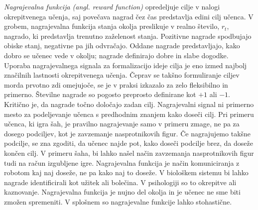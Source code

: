 \documentclass[a4paper, oneside, 12pt]{report}
\begin{document}
{\em Nagrajevalna funkcija (angl. reward function)} opredeljuje cilje v nalogi okrepitvenega učenja, saj povečava nagrad čez čas predstavlja edini cilj učenca. V grobem, nagrajevalna funkcija stanja okolja preslikuje v realno število, $r_t$, nagrado, ki predstavlja trenutno zaželenost stanja. Pozitivne nagrade spodbujajo obiske stanj, negativne pa jih odvračajo. Oddane nagrade predstavljajo, kako dobro se učenec vede v okolju; nagrade definirajo dobre in slabe dogodke. Uporaba nagrajevalnega signala za formalizacijo ideje cilja je eno izmed najbolj značilnih lastnosti okrepitvenega učenja. Čeprav se takšno formuliranje ciljev morda prvotno zdi omejujoče, se je v praksi izkazalo za zelo fleksibilno in primerno. Številne nagrade so pogosto preprosto definirane kot $+1$ ali $-1$. Kritično je, da nagrade točno določajo zadan cilj. Nagrajevalni signal ni primerno mesto za podeljevanje učenca s predhodnim znanjem kako doseči cilj. Pri primeru učenca, ki igra šah, je pravilno nagrajevanje samo v primeru zmage, ne pa za dosego podciljev, kot je zavzemanje nasprotnikovih figur. Če nagrajujemo takšne podcilje, se zna zgoditi, da učenec najde pot, kako doseči podcilje brez, da doseže končen cilj. V primeru šaha, bi lahko našel način zavzemanja nasprotnikovih figur tudi na račun izgubljene igre. Nagrajevalna funkcija je način komuniciranja z robotom kaj naj doseže, ne pa kako naj to doseže. V biološkem sistemu bi lahko nagrade identificirali kot užitek ali bolečina. V psihologiji so to okrepitve ali kaznovanje. Nagrajevalna funkcija je nujno del okolja in je učenec ne sme biti zmožen spremeniti. V splošnem so nagrajevalne funkcije lahko stohastične.
\end{document}

